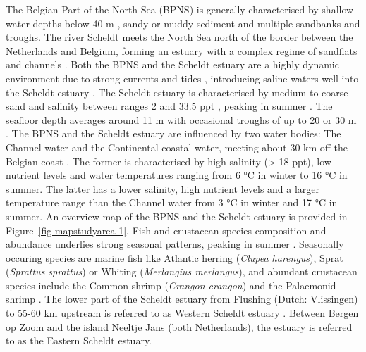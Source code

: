 \documentclass[
  authoryear,
  review,
  3p]{elsarticle}
\begin{document}
The Belgian Part of the North Sea (BPNS) is generally characterised by
shallow water depths below 40 m \citep{thierry_2019}, sandy or muddy
sediment \citep{wolff_1973, vasquez_2021} and multiple sandbanks and
troughs. The river Scheldt meets the North Sea north of the border
between the Netherlands and Belgium, forming an estuary with a complex
regime of sandflats and channels \citep{claessens_1988}. Both the BPNS
and the Scheldt estuary are a highly dynamic environment due to strong
currents and tides \citep{otto_1990}, introducing saline waters well
into the Scheldt estuary \citep{ouboter_1998}. The Scheldt estuary is
characterised by medium to coarse sand and salinity between ranges 2 and
33.5 ppt \citep{baeyens_1998}, peaking in summer \citep{maes_1998}. The
seafloor depth averages around 11 m with occasional troughs of up to 20
or 30 m \citep{thierry_2019}. The BPNS and the Scheldt estuary are
influenced by two water bodies: The Channel water and the Continental
coastal water, meeting about 30 km off the Belgian coast
\citep{wolff_1973}. The former is characterised by high salinity
(\textgreater{} 18 ppt), low nutrient levels and water temperatures
ranging from 6 °C in winter to 16 °C in summer. The latter has a lower
salinity, high nutrient levels and a larger temperature range than the
Channel water from 3 °C in winter and 17 °C in summer. An overview map
of the BPNS and the Scheldt estuary is provided in
Figure~\ref{fig-mapstudyarea-1}. Fish and crustacean species composition
and abundance underlies strong seasonal patterns, peaking in summer
\citep{maes_1998, maes_2005}. Seasonally occuring species are marine
fish like Atlantic herring (\emph{Clupea harengus}), Sprat
(\emph{Sprattus sprattus}) or Whiting (\emph{Merlangius merlangus}), and
abundant crustacean species include the Common shrimp (\emph{Crangon
crangon}) and the Palaemonid shrimp \citep[\emph{Palaemon
varians},][]{maes_1998}. The lower part of the Scheldt estuary from
Flushing (Dutch: Vlissingen) to 55-60 km upstream is referred to as
Western Scheldt estuary \citep{baeyens_1998, ouboter_1998}. Between
Bergen op Zoom and the island Neeltje Jans (both Netherlands), the
estuary is referred to as the Eastern Scheldt estuary.
\end{document}
